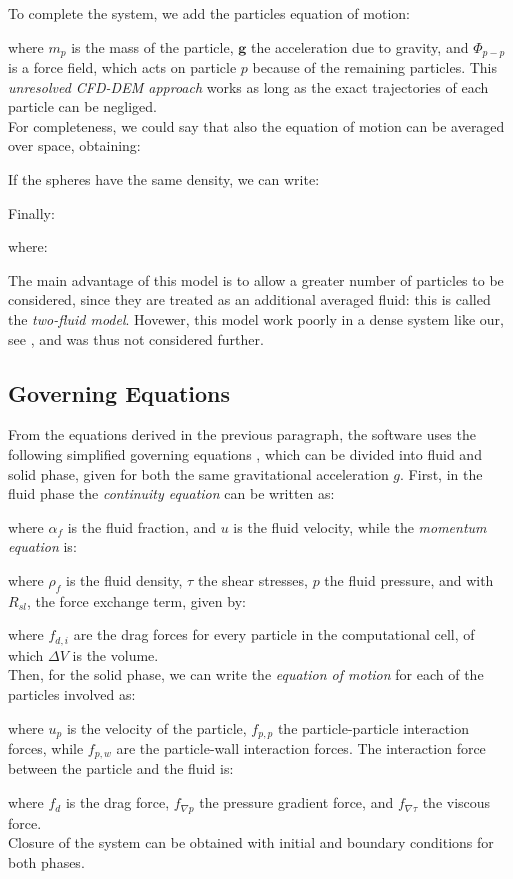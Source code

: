 
To complete the system, we add the particles equation of motion:

where $m_p$ is the mass of the particle, $\mathbf{g}$ the acceleration due to
gravity, and $\Phi_{p-p}$ is a force field, which acts on particle $p$ because
of the remaining particles.
This \textit{unresolved \acs{CFD}-\acs{DEM} approach} works as long as the exact
trajectories of each particle can be negliged.\\
For completeness, we could say that also the equation of motion can be averaged
over space, obtaining:

If the spheres have the same density, we can write:

Finally:

where:

The main advantage of this model is to allow a greater number of particles to be
considered, since they are treated as an additional averaged fluid: this is
called the \textit{two-fluid model}.
Hovewer, this model work poorly in a dense system like our, see
\citet{Refworks:202}, and was thus not considered further.

\subsection{Governing Equations}
\label{subsec:governingequations}
From the equations derived in the previous paragraph, the software uses the
following simplified governing equations \cite{Refworks:202}, which can be
divided into fluid and solid phase, given for both the same gravitational
acceleration $g$.
First, in the fluid phase the \textit{continuity equation} can be written as:

where $\alpha_f$ is the fluid fraction, and $u$ is the fluid velocity, while the
\textit{momentum equation} is:

where $\rho_f$ is the fluid density, $\tau$ the shear stresses, $p$ the fluid
pressure, and with $R_{sl}$, the force exchange term, given by:

where $f_{d,i}$ are the drag forces for every particle in the computational
cell, of which $\Delta V$ is the volume. \\
Then, for the solid phase, we can write the \textit{equation of motion} for each
of the particles involved as:

where $u_p$ is the velocity of the particle, $f_{p,p}$ the
particle-particle interaction forces, while $f_{p,w}$ are the particle-wall
interaction forces. The interaction force between the particle and the
fluid is:

where $f_d$ is the drag force, $f_{\nabla p}$ the pressure gradient force,
and $f_{\nabla \tau}$ the viscous force.\\
Closure of the system can be obtained with initial and
boundary conditions for both phases.

